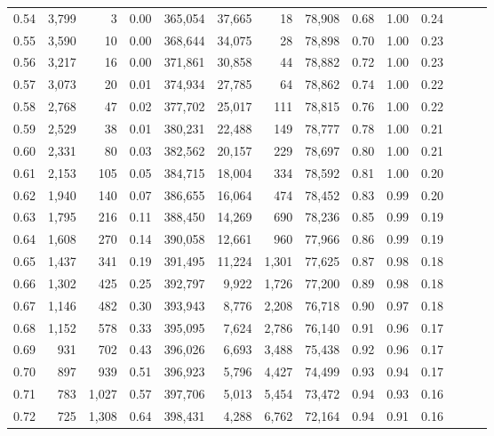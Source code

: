 \begin{tabular}{rrrrrrrrrrrrrr}
0.54 &  3,799 &      3 &  0.00 &  365,054 &   37,665 &      18 &  78,908 &  0.68 &  1.00 &      0.24 \\
0.55 &  3,590 &     10 &  0.00 &  368,644 &   34,075 &      28 &  78,898 &  0.70 &  1.00 &      0.23 \\
0.56 &  3,217 &     16 &  0.00 &  371,861 &   30,858 &      44 &  78,882 &  0.72 &  1.00 &      0.23 \\
0.57 &  3,073 &     20 &  0.01 &  374,934 &   27,785 &      64 &  78,862 &  0.74 &  1.00 &      0.22 \\
0.58 &  2,768 &     47 &  0.02 &  377,702 &   25,017 &     111 &  78,815 &  0.76 &  1.00 &      0.22 \\
0.59 &  2,529 &     38 &  0.01 &  380,231 &   22,488 &     149 &  78,777 &  0.78 &  1.00 &      0.21 \\
0.60 &  2,331 &     80 &  0.03 &  382,562 &   20,157 &     229 &  78,697 &  0.80 &  1.00 &      0.21 \\
0.61 &  2,153 &    105 &  0.05 &  384,715 &   18,004 &     334 &  78,592 &  0.81 &  1.00 &      0.20 \\
0.62 &  1,940 &    140 &  0.07 &  386,655 &   16,064 &     474 &  78,452 &  0.83 &  0.99 &      0.20 \\
0.63 &  1,795 &    216 &  0.11 &  388,450 &   14,269 &     690 &  78,236 &  0.85 &  0.99 &      0.19 \\
0.64 &  1,608 &    270 &  0.14 &  390,058 &   12,661 &     960 &  77,966 &  0.86 &  0.99 &      0.19 \\
0.65 &  1,437 &    341 &  0.19 &  391,495 &   11,224 &   1,301 &  77,625 &  0.87 &  0.98 &      0.18 \\
0.66 &  1,302 &    425 &  0.25 &  392,797 &    9,922 &   1,726 &  77,200 &  0.89 &  0.98 &      0.18 \\
0.67 &  1,146 &    482 &  0.30 &  393,943 &    8,776 &   2,208 &  76,718 &  0.90 &  0.97 &      0.18 \\
0.68 &  1,152 &    578 &  0.33 &  395,095 &    7,624 &   2,786 &  76,140 &  0.91 &  0.96 &      0.17 \\
0.69 &    931 &    702 &  0.43 &  396,026 &    6,693 &   3,488 &  75,438 &  0.92 &  0.96 &      0.17 \\
0.70 &    897 &    939 &  0.51 &  396,923 &    5,796 &   4,427 &  74,499 &  0.93 &  0.94 &      0.17 \\
0.71 &    783 &  1,027 &  0.57 &  397,706 &    5,013 &   5,454 &  73,472 &  0.94 &  0.93 &      0.16 \\
0.72 &    725 &  1,308 &  0.64 &  398,431 &    4,288 &   6,762 &  72,164 &  0.94 &  0.91 &      0.16 \\

\end{tabular}
